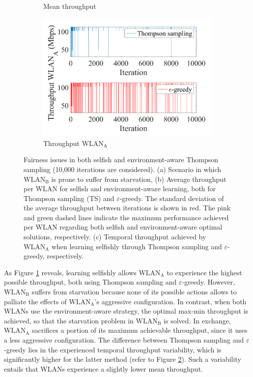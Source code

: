 \documentclass{article}
\begin{document}
\begin{figure}[h!]
\begin{subfigure}[b]{0.36\linewidth}
		\caption{Mean throughput}\label{fig:scenario_1_new}
	\end{subfigure}
	\begin{subfigure}[b]{0.36\textwidth}
		\includegraphics[width=\textwidth]{experiment_2_1_variability}
		\caption{Throughput $\text{WLAN}_\text{A}$}
		\label{fig:experiment_2_1_variability}
	\end{subfigure}
	\caption{Fairness issues in both selfish and environment-aware Thompson sampling (10,000 iterations are considered). (a) Scenario in which $\text{WLAN}_\text{B}$ is prone to suffer from starvation, (b) Average throughput per WLAN for selfish and environment-aware learning, both for Thompson sampling (TS) and $\varepsilon$-greedy. The standard deviation of the average throughput between iterations is shown in red. The pink and green dashed lines indicate the maximum performance achieved per WLAN regarding both selfish and environment-aware optimal solutions, respectively. (c) Temporal throughput achieved by $\text{WLAN}_\text{A}$ when learning selfishly through Thompson sampling and $\varepsilon$-greedy, respectively.}
	\label{fig:selfish_learning_fairness_issue}
\end{figure}   	

As Figure \ref{fig:scenario_1_new} reveals, learning selfishly allows $\text{WLAN}_\text{A}$ to experience the highest possible throughput, both using Thompson sampling and $\varepsilon$-greedy. However, $\text{WLAN}_\text{B}$ suffers from starvation because none of its possible actions allows to palliate the effects of $\text{WLAN}_\text{A}$'s aggressive configuration. In contrast, when both WLANs use the environment-aware strategy, the optimal max-min throughput is achieved, so that the starvation problem in $\text{WLAN}_\text{B}$ is solved. In exchange, $\text{WLAN}_\text{A}$ sacrifices a portion of its maximum achievable throughput, since it uses a less aggressive configuration. The difference between Thompson sampling and $\varepsilon$-greedy lies in the experienced temporal throughput variability, which is significantly higher for the latter method (refer to Figure \ref{fig:experiment_2_1_variability}). Such a variability entails that WLANs experience a slightly lower mean throughput.
\end{document}

